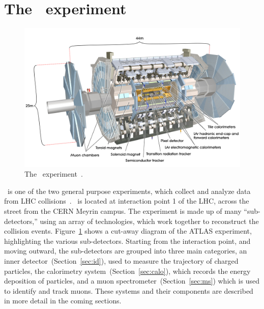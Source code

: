 \section{The \atlas\ experiment}

\begin{figure}[ht]
  \centering
  \includegraphics[width=\textwidth, clip=true, trim=0 0 0 0]
    {figs/lhc/atlas_det.jpg}
  \caption{
    The \atlas\ experiment~\cite{Pequenao:1095924}.
  }
  \label{fig:atlas_det}
\end{figure}

\atlas\ is one of the two general purpose experiments, which
collect and analyze data from LHC collisions~\cite{cern-jinst-atlas}.
\atlas\ is located at interaction point 1 of the LHC, across the street from
the CERN Meyrin campus.
The experiment is made up of many ``sub-detectors,'' using an array of
technologies, which work together to reconstruct the collision events.
Figure~\ref{fig:atlas_det} shows a cut-away diagram of the ATLAS experiment,
highlighting the various sub-detectors.
Starting from the interaction point, and moving outward, the sub-detectors
are grouped into three main categories, an inner
detector~(Section~\ref{sec:id}), used to measure the trajectory of charged
particles, the calorimetry system~(Section~\ref{sec:calo}), which records the
energy deposition of particles, and a muon spectrometer~(Section~\ref{sec:ms})
which is used to identify and track muons.
These systems and their components are described in more detail in the coming
sections.

